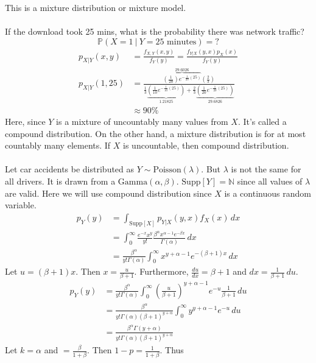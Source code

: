 \documentclass[12pt]{article}
\newcommand{\cprob}[2]{\mathbb{P}(#1 ~|~ #2)}
\newcommand{\supp}[1]{\text{Supp}[ #1 ]}
\begin{document}
This is a mixture distribution or mixture model. \\~\\
If the download took 25 mins, what is the probability there was network traffic? $$\cprob{X=1}{Y = 25 \text{ minutes}} = ?$$ $$ \begin{aligned} p_{X|Y}(x,y) &= \frac{f_{X,Y}(x,y)}{f_Y(y)} = \frac{f_{Y|X}(y,x) p_X(x)}{f_Y(y)} \\ p_{X|Y}(1,25) &= \frac{\overbrace{(\frac{1}{20})e^{-\frac{1}{20}(25)}}^{29.6026}(\frac{2}{3})}{\frac{1}{3}\underbrace{(\frac{1}{10} e^{-\frac{1}{10}(25)})}_{1.21825} + \frac{2}{3}\underbrace{(\frac{1}{20}e^{-\frac{1}{20}(25)})}_{29.6826}} \\ &\approx 90\% \end{aligned} $$ 
Here, since $Y$ is a mixture of uncountably many values from $X$. It's called a compound distribution. On the other hand, a mixture distribution is for at most countably many elements. If $X$ is uncountable, then compound distribution. \\~\\
Let car accidents be distributed as $Y \sim \text{Poisson}(\lambda)$. But $\lambda$ is not the same for all drivers. It is drawn from a $\text{Gamma}(\alpha, \beta)$. $\supp{Y} = \mathbb{N}$ since all values of $\lambda$ are valid. Here we will use compound distribution since $X$ is a continuous random variable. $$ \begin{aligned} 
p_Y(y) &= \int_{\supp{X}} p_{Y|X}(y,x) f_X(x) \, dx \\ &= \int_0^\infty \frac{e^{-x}x^y}{y!} \frac{\beta^\alpha x^{\alpha - 1} e^{-\beta x}}{\Gamma(\alpha)} \, dx \\ &= \frac{\beta^\alpha}{y!\Gamma(\alpha)} \int_0^\infty x^{y + \alpha - 1} e^{-(\beta + 1)x} \,dx \end{aligned} $$ 
Let $u = (\beta + 1)x$. Then $x = \frac{u}{\beta + 1}$. Furthermore, $\frac{du}{dx} = \beta + 1$ and $dx = \frac{1}{\beta + 1} \, du$. $$ \begin{aligned} p_Y(y) &= \frac{\beta^\alpha}{y!\Gamma(\alpha)}\int_0^\infty (\frac{u}{\beta + 1})^{y + \alpha - 1} e^{-u} \frac{1}{\beta + 1} \,du \\ &= \frac{\beta^\alpha}{y!\Gamma(\alpha)(\beta + 1)^{y + \alpha}}\int_0^\infty y^{y + \alpha - 1} e^{-u} \, du \\ &= \frac{\beta^{\alpha} \Gamma(y + \alpha)}{y!\Gamma(\alpha)(\beta + 1)^{y + \alpha}} \end{aligned}$$ 
Let $k = \alpha$ and $= \frac{\beta}{1 + \beta}$. Then $1 - p = \frac{1}{1+\beta}$. Thus 
\end{document}
